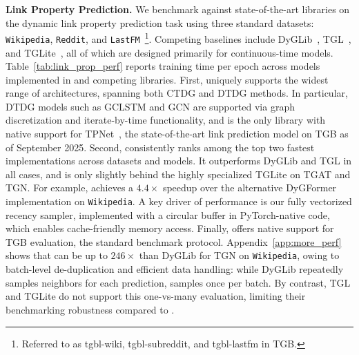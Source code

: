 \textbf{Link Property Prediction.} We benchmark \name against state-of-the-art libraries on the dynamic link property prediction task using three standard datasets: \texttt{Wikipedia}, \texttt{Reddit}, and \texttt{LastFM}~\footnote{Referred to as tgbl-wiki, tgbl-subreddit, and tgbl-lastfm in TGB.}. Competing baselines include DyGLib~\citep{dygfomer}, TGL~\citep{tgl_paper}, and TGLite~\citep{10.1145/3620665.3640414}, all of which are designed primarily for continuous-time models.
Table~\ref{tab:link_prop_perf} reports training time per epoch across models implemented in \name and competing libraries. First, \name uniquely supports the widest range of architectures, spanning both CTDG and DTDG methods. In particular, DTDG models such as GCLSTM and GCN are supported via graph discretization and iterate-by-time functionality, and \name is the only library with native support for TPNet~\citep{DBLP:conf/nips/LuSZL24}, the state-of-the-art link prediction model on TGB as of September 2025. Second, \name consistently ranks among the top two fastest implementations across datasets and models. It outperforms DyGLib and TGL in all cases, and is only slightly behind the highly specialized TGLite on TGAT and TGN. For example, \name achieves a $4.4\times$ speedup over the alternative DyGFormer implementation on \texttt{Wikipedia}. A key driver of performance is our fully vectorized recency sampler, implemented with a circular buffer in PyTorch-native code, which enables cache-friendly memory access. Finally, \name offers native support for TGB evaluation, the standard benchmark protocol. Appendix~\ref{app:more_perf} shows that \name can be up to $246\times$ than DyGLib for TGN on \texttt{Wikipedia}, owing to batch-level de-duplication and efficient data handling: while DyGLib repeatedly samples neighbors for each prediction, \name samples once per batch. By contrast, TGL and TGLite do not support this one-vs-many evaluation, limiting their benchmarking robustness compared to \name.


